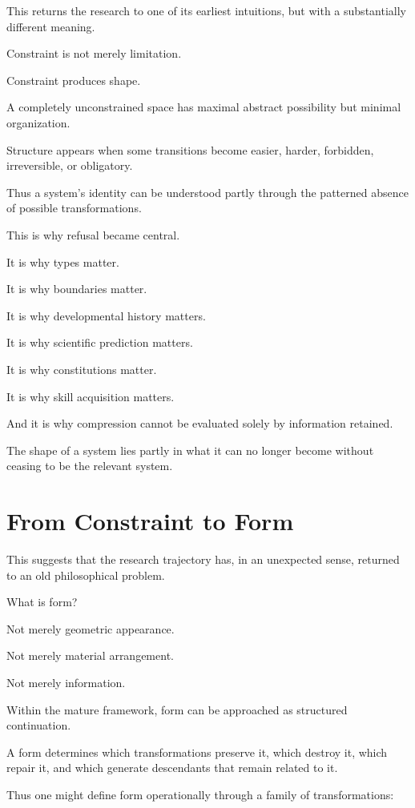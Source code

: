 \documentclass[11pt]{article}
\theoremstyle{remark}
\begin{document}
This returns the research to one of its earliest intuitions, but with a substantially different meaning.

Constraint is not merely limitation.

Constraint produces shape.

A completely unconstrained space has maximal abstract possibility but minimal organization.

Structure appears when some transitions become easier, harder, forbidden, irreversible, or obligatory.

Thus a system's identity can be understood partly through the patterned absence of possible transformations.

This is why refusal became central.

It is why types matter.

It is why boundaries matter.

It is why developmental history matters.

It is why scientific prediction matters.

It is why constitutions matter.

It is why skill acquisition matters.

And it is why compression cannot be evaluated solely by information retained.

The shape of a system lies partly in what it can no longer become without ceasing to be the relevant system.

\section{From Constraint to Form}

This suggests that the research trajectory has, in an unexpected sense, returned to an old philosophical problem.

What is form?

Not merely geometric appearance.

Not merely material arrangement.

Not merely information.

Within the mature framework, form can be approached as structured continuation.

A form determines which transformations preserve it, which destroy it, which repair it, and which generate descendants that remain related to it.

Thus one might define form operationally through a family of transformations:
\end{document}
